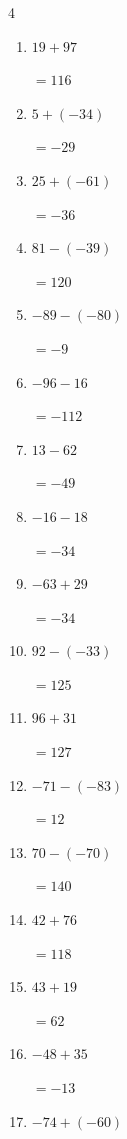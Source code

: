 \begin{multicols}{4}
\begin{enumerate}
        $=99$

  \item $19+97$

        $=116$

  \item $5+(-34)$

        $=-29$

  \item $25+(-61)$

        $=-36$

  \item $81-(-39)$

        $=120$

  \item $-89-(-80)$

        $=-9$

  \item $-96-16$

        $=-112$

  \item $13-62$

        $=-49$

  \item $-16-18$

        $=-34$

  \item $-63+29$

        $=-34$

  \item $92-(-33)$

        $=125$

  \item $96+31$

        $=127$

  \item $-71-(-83)$

        $=12$

  \item $70-(-70)$

        $=140$

  \item $42+76$

        $=118$

  \item $43+19$

        $=62$

\columnbreak %

  \item $-48+35$

        $=-13$

  \item $-74+(-60)$


\end{enumerate}
\end{multicols}
